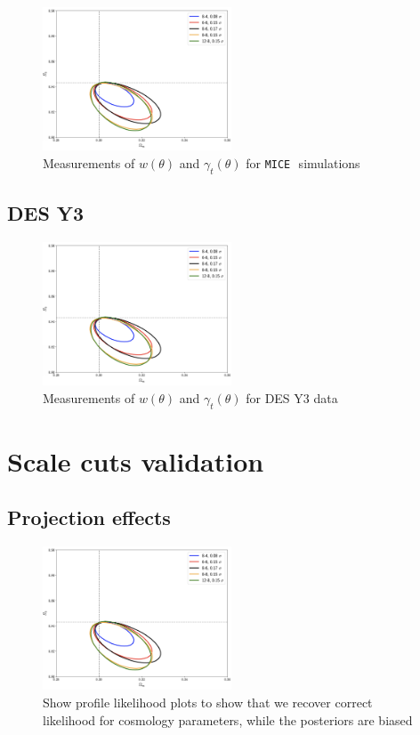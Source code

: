 \documentclass[fleqn,usenatbib]{mnras}
\newcommand{\gammat}{\ensuremath{\gamma_{t}(\theta)} }
\newcommand{\wtheta}{\ensuremath{w(\theta)} }
\newcommand{\mice}{\texttt{MICE}\,}
\begin{document}
\begin{figure}
\includegraphics[width=0.5\textwidth,draft]{figs/temp.png}
\caption[]{Measurements of \wtheta and \gammat for \mice \  simulations }
\label{fig:mice_2pt}
\end{figure}

\subsection{DES Y3}
\begin{figure}
\includegraphics[width=0.5\textwidth,draft]{figs/temp.png}
\caption[]{Measurements of \wtheta and \gammat for DES Y3 data }
\label{fig:data_2pt}
\end{figure}

\section{Scale cuts validation}\label{app:scale_cuts}
\subsection{Projection effects}\label{app:projection_effects}

\begin{figure}
\includegraphics[width=0.5\textwidth,draft]{figs/temp.png}
\caption[]{Show profile likelihood plots to show that we recover correct likelihood for cosmology parameters, while the posteriors are biased}
\label{fig:prof_like}
\end{figure}
\end{document}
